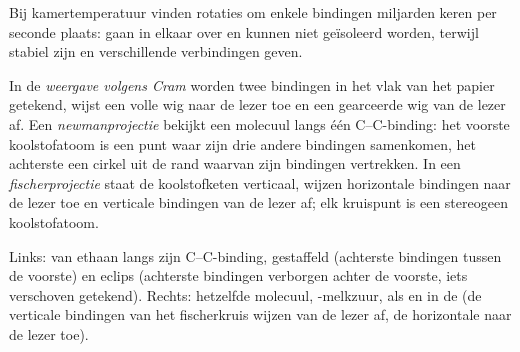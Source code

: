 Bij kamertemperatuur vinden rotaties om enkele bindingen miljarden keren
per seconde plaats:  gaan in elkaar over en kunnen niet
geïsoleerd worden, terwijl  stabiel zijn en verschillende
verbindingen geven.

\begin{definition}[Voorstellingen]\label{def:b1:stereochemistry-in-depth:representations}
In de \emph{weergave volgens Cram} worden
twee bindingen in het vlak van het papier getekend, wijst een volle wig
naar de lezer toe en een gearceerde wig van de lezer af. Een
\emph{newmanprojectie} bekijkt een molecuul langs
één C--C-binding: het voorste koolstofatoom is een punt waar zijn drie
andere bindingen samenkomen, het achterste een cirkel uit de rand
waarvan zijn bindingen vertrekken. In een
\emph{fischerprojectie} staat de koolstofketen
verticaal, wijzen horizontale bindingen naar de lezer toe en verticale
bindingen van de lezer af; elk kruispunt is een stereogeen
koolstofatoom.
\end{definition}

\begin{omfigure}

{\small Links:  van ethaan langs zijn C--C-binding,
gestaffeld (achterste bindingen tussen de voorste) en eclips (achterste
bindingen verborgen achter de voorste, iets verschoven getekend). Rechts:
hetzelfde molecuul, -melkzuur, als  en in de
 (de verticale bindingen van het fischerkruis
wijzen van de lezer af, de horizontale naar de lezer toe).}
\end{omfigure}

